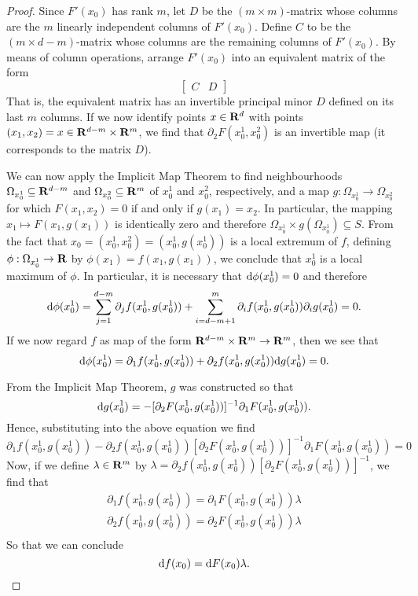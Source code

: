 \begin{proof}
Since \(F'(x_0)\) has rank \(m\), let \(D\) be the \((m \times m)\)-matrix whose
columns are the \(m\) linearly independent columns of \(F'(x_0)\). Define
\(C\) to be the \((m \times d - m)\)-matrix whose columns are the remaining columns
of \(F'(x_0)\). By means of column operations, arrange \(F'(x_0)\) into an
equivalent matrix of the form
\[
  \begin{bmatrix}
    C & D
  \end{bmatrix}
\]
That is, the equivalent matrix has an invertible principal minor \(D\) defined
on its last \(m\) columns. If we now identify points \(x \in \mathbf{R}^d\) with points
\((x_1, x_2) = x \in \mathbf{R}^{d-m} \times \mathbf{R}^m\), we find that \(\partial_2 F(x_0^1, x_0^2)\) is an
invertible map (it corresponds to the matrix \(D\)).

We can now apply the Implicit Map Theorem to find neighbourhoods \(\Omega_{x_{0}^1}
\subseteq \mathbf{R}^{d-m}\) and \(\Omega_{x_0^2} \subseteq \mathbf{R}^m\) of \(x_0^1\) and \(x_0^2\), respectively,
and a map \(g: \Omega_{x_0^1} \to \Omega_{x_0^2}\) for which \(F(x_{1}, x_2) = 0\) if and
only if \(g(x_1) = x_2\). In particular, the mapping \(x_1 \mapsto F(x_1, g(x_1))\)
is identically zero and therefore \(\Omega_{x_0^1} \times g(\Omega_{x_0^1}) \subseteq S\). From the
fact that \(x_0 = (x_0^1, x_0^2) = (x_0^1, g(x_0^1))\) is a local extremum of
\(f\), defining \(\phi: \Omega_{x_0^{1}} \to \mathbf{R}\) by \(\phi(x_1) = f(x_1, g(x_1))\), we
conclude that \(x_0^1\) is a local maximum of \(\phi\). In particular, it is
necessary that \(\mathrm{d} \phi(x_0^1) = 0\) and therefore
\[
  \mathrm{d} \phi(x_0^{1}) = \sum_{j=1}^{d-m} \partial_j f(x_0^1, g(x_0^1)) + \sum_{i = d - m +
    1}^{m} \partial_i f(x_0^1, g(x_0^1)) \partial_i g(x_0^1) = 0.
\]
If we now regard \(f\) as map of the form \(\mathbf{R}^{d-m} \times \mathbf{R}^m \to \mathbf{R}^m\), then we
see that
\[
  \mathrm{d} \phi(x_0^1) = \partial_1 f(x_0^1, g(x_0^1)) + \partial_{2} f(x_0^1, g(x_0^1)) \mathrm{d}
  g(x_0^1) = 0.
\]

From the Implicit Map Theorem, \(g\) was constructed so that
\[
  \mathrm{d} g(x_0^1) = - [\partial_2F(x_0^1, g(x_0^1))]^{-1} \partial_1 F(x_0^1, g(x_{0}^1)).
\]
Hence, substituting into the above equation we find
\[
  \partial_1 f(x_0^1, g(x_0^1)) - \partial_2 f(x_0^1, g(x_0^1)) [\partial_2 F(x_0^1,
  g(x_0^1))]^{-1} \partial_1 F(x_0^1, g(x_0^1)) = 0
\]
Now, if we define \(\lambda \in \mathbf{R}^m\) by \(\lambda = \partial_2f(x_0^{1}, g(x_{0}^{1})) [\partial_2
F(x_{0}^1, g(x_0^1))]^{-1}\), we find that
\begin{gather*}
  \partial_1 f(x_0^{1}, g(x_0^1)) = \partial_1 F(x_0^1, g(x_0^1)) \lambda \\
  \partial_2 f(x_0^{1}, g(x_0^1)) = \partial_2 F(x_0^1, g(x_0^1)) \lambda \\
\end{gather*}
So that we can conclude
\[
  \mathrm{d} f(x_0) = \mathrm{d} F(x_0) \lambda.
\]
\end{proof}

